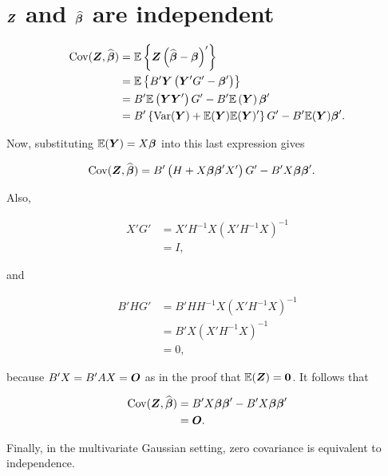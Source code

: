 \section{$\boldsymbol{Z}$ and $\boldsymbol{\widehat{\beta}}$ are independent}
\label{app:Z_and_beta_independent}

\begin{align*}
	\operatorname{Cov}(\boldsymbol{Z},\widehat{\boldsymbol{\beta}})
	&= \mathbb{E}\left\{\boldsymbol{Z}\left(\widehat{\boldsymbol{\beta}}-\boldsymbol{\beta}\right)'\right\} \\
	&= \mathbb{E}\left\{B'\boldsymbol{Y}\left(\boldsymbol{Y}'G'-\boldsymbol{\beta}'\right)\right\} \\
	&= B'\mathbb{E}\left(\boldsymbol{Y}\boldsymbol{Y}'\right)G'
	- B'\mathbb{E}\left(\boldsymbol{Y}\right)\boldsymbol{\beta}' \\
	&= B'\left\{\operatorname{Var}(\boldsymbol{Y})
	+ \mathbb{E}(\boldsymbol{Y})\mathbb{E}(\boldsymbol{Y})'\right\}G'
	- B'\mathbb{E}(\boldsymbol{Y})\boldsymbol{\beta}' .
\end{align*}

Now, substituting $\mathbb{E}(\boldsymbol{Y}) = X\boldsymbol{\beta}$ into this last expression gives

\begin{align*}
	\operatorname{Cov}(\boldsymbol{Z},\widehat{\boldsymbol{\beta}})
	&= B'\left(H + X\boldsymbol{\beta}\boldsymbol{\beta}'X'\right)G'
	- B'X\boldsymbol{\beta}\boldsymbol{\beta}' .
\end{align*}

Also,

\begin{align*}
	X'G'
	&= X'H^{-1}X\left(X'H^{-1}X\right)^{-1} \\
	&= I,
\end{align*}

and

\begin{align*}
	B'HG'
	&= B'HH^{-1}X\left(X'H^{-1}X\right)^{-1} \\
	&= B'X\left(X'H^{-1}X\right)^{-1} \\
	&= 0,
\end{align*}

because $B'X = B'AX = \boldsymbol{O}$ as in the proof that
$\mathbb{E}(\boldsymbol{Z}) = \boldsymbol{0}$. It follows that

\begin{align*}
	\operatorname{Cov}(\boldsymbol{Z},\widehat{\boldsymbol{\beta}})
	&= B'X\boldsymbol{\beta}\boldsymbol{\beta}'
	- B'X\boldsymbol{\beta}\boldsymbol{\beta}' \\
	&= \boldsymbol{O}.
\end{align*}

Finally, in the multivariate Gaussian setting, zero covariance is equivalent to independence.